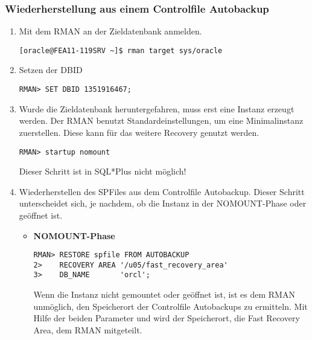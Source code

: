         \subsubsection{Wiederherstellung aus einem Controlfile Autobackup}
          \begin{enumerate}
            \item Mit dem RMAN an der Zieldatenbank anmelden.
              \begin{lstlisting}[caption={An der Zieldatenbank anmelden},label=admin1418,language=rman]
[oracle@FEA11-119SRV ~]$ rman target sys/oracle
              \end{lstlisting}
            \item Setzen der DBID
              \begin{lstlisting}[caption={Setzen der DBID},label=admin1419,language=rman]
RMAN> SET DBID 1351916467;
              \end{lstlisting}
            \item Wurde die Zieldatenbank heruntergefahren, muss erst eine Instanz erzeugt werden. Der RMAN benutzt Standardeinstellungen, um eine Minimalinstanz zuerstellen. Diese kann für das weitere Recovery genutzt werden.
              \begin{lstlisting}[caption={Zieldatenbank im RMAN in den NOMOUNT-Status bringen},label=admin1420,language=rman,alsolanguage=sqlplus]
RMAN> startup nomount
              \end{lstlisting}
              \begin{merke}
                Dieser Schritt ist in SQL*Plus nicht möglich!
              \end{merke}
            \item Wiederherstellen des SPFiles aus dem Controlfile Autobackup. Dieser Schritt unterscheidet sich, je nachdem, ob die Instanz in der NOMOUNT-Phase oder geöffnet ist.
              \begin{itemize}
                \item \textbf{NOMOUNT-Phase}
                  \begin{lstlisting}[caption={Wiederherstellen des SPFiles aus dem Controlfile Autobackup},label=admin1421,language=rman]
RMAN> RESTORE spfile FROM AUTOBACKUP
2>    RECOVERY AREA '/u05/fast_recovery_area'
3>    DB_NAME       'orcl';
                  \end{lstlisting}
                  \begin{merke}
                    Wenn die Instanz nicht gemountet oder geöffnet ist, ist es dem RMAN unmöglich, den Speicherort der Controlfile Autobackups zu ermitteln. Mit Hilfe der beiden Parameter  und  wird der Speicherort, die Fast Recovery Area, dem RMAN mitgeteilt.

\end{merke}
\end{itemize}
\end{enumerate}
